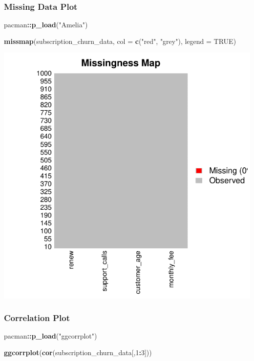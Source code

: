 \documentclass[
]{article}
\newenvironment{Shaded}{\begin{snugshade}}{\end{snugshade}}
\newcommand{\AttributeTok}[1]{\textcolor[rgb]{0.13,0.29,0.53}{#1}}
\newcommand{\ConstantTok}[1]{\textcolor[rgb]{0.56,0.35,0.01}{#1}}
\newcommand{\DecValTok}[1]{\textcolor[rgb]{0.00,0.00,0.81}{#1}}
\newcommand{\FunctionTok}[1]{\textcolor[rgb]{0.13,0.29,0.53}{\textbf{#1}}}
\newcommand{\NormalTok}[1]{#1}
\newcommand{\SpecialCharTok}[1]{\textcolor[rgb]{0.81,0.36,0.00}{\textbf{#1}}}
\newcommand{\StringTok}[1]{\textcolor[rgb]{0.31,0.60,0.02}{#1}}
\begin{document}
\subsubsection{Missing Data Plot}\label{missing-data-plot}

\begin{Shaded}
\begin{Highlighting}[]
\NormalTok{pacman}\SpecialCharTok{::}\FunctionTok{p\_load}\NormalTok{(}\StringTok{"Amelia"}\NormalTok{)}

\FunctionTok{missmap}\NormalTok{(subscription\_churn\_data, }\AttributeTok{col =} \FunctionTok{c}\NormalTok{(}\StringTok{"red"}\NormalTok{, }\StringTok{"grey"}\NormalTok{), }\AttributeTok{legend =} \ConstantTok{TRUE}\NormalTok{)}
\end{Highlighting}
\end{Shaded}

\includegraphics{3_logistic_regression_files/figure-latex/missing_data_plot-1.pdf}

\subsubsection{Correlation Plot}\label{correlation-plot}

\begin{Shaded}
\begin{Highlighting}[]
\NormalTok{pacman}\SpecialCharTok{::}\FunctionTok{p\_load}\NormalTok{(}\StringTok{"ggcorrplot"}\NormalTok{)}

\FunctionTok{ggcorrplot}\NormalTok{(}\FunctionTok{cor}\NormalTok{(subscription\_churn\_data[,}\DecValTok{1}\SpecialCharTok{:}\DecValTok{3}\NormalTok{]))}
\end{Highlighting}
\end{Shaded}
\end{document}
